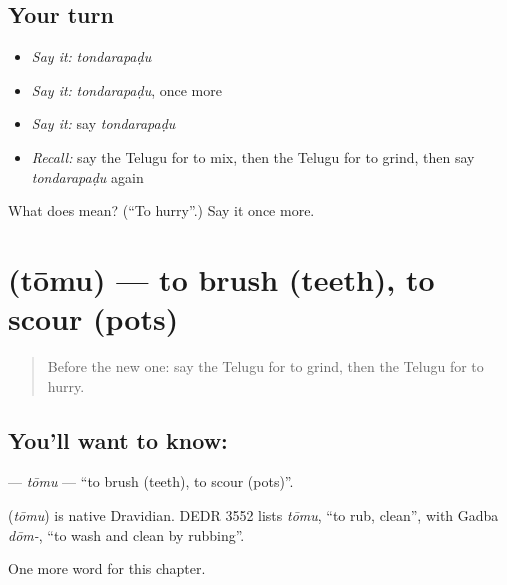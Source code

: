\subsection*{Your turn}
\begin{itemize}
\raggedright
  \item \emph{Say it:} \emph{tondarapaḍu}
  \item \emph{Say it:} \emph{tondarapaḍu}, once more
  \item \emph{Say it:} say \emph{tondarapaḍu}
  \item \emph{Recall:} say the Telugu for to mix, then the Telugu for to grind, then say \emph{tondarapaḍu} again
\end{itemize}

\begin{tcolorbox}[breakable,colback=teal!4,colframe=teal!35!black,title={Before you move on}]
What does  mean? (\textquotedblleft{}To hurry\textquotedblright{}.) Say it once more.
\end{tcolorbox}
\section[\texorpdfstring{\te{తోము} (tōmu)}{తోము (tōmu)}]{ (tōmu) — to brush (teeth), to scour (pots)}

\label{lesson:TE-C158-tomu}



\begin{quote}
Before the new one: say the Telugu for to grind, then the Telugu for to hurry.
\end{quote}

\subsection*{You'll want to know: }
\textbf{} — \emph{tōmu} — \textquotedblleft{}to brush (teeth), to scour (pots)\textquotedblright{}.

\begin{cousinweb}
\textbf{} (\emph{tōmu}) is native Dravidian. DEDR 3552 lists \emph{tōmu}, \textquotedblleft{}to rub, clean\textquotedblright{}, with Gadba \emph{dōm-}, \textquotedblleft{}to wash and clean by rubbing\textquotedblright{}.
\end{cousinweb}

\begin{grammarlens}[title={What you've built}]
One more word for this chapter.
\end{grammarlens}

